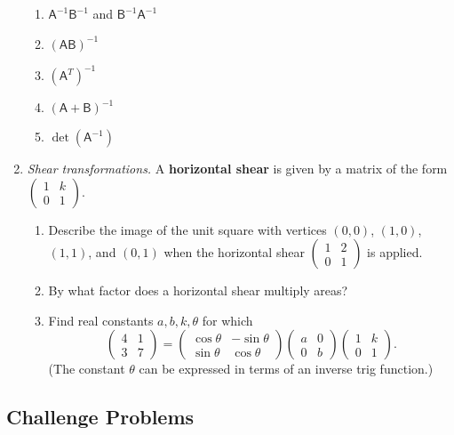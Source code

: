 \begin{enumerate}
\begin{enumerate}
\item $\mathsf{A}^{-1}\mathsf{B}^{-1}$ and $\mathsf{B}^{-1}\mathsf{A}^{-1}$
\item $(\mathsf{AB})^{-1}$
\item $(\mathsf{A}^T)^{-1}$
\item $(\mathsf{A} + \mathsf{B})^{-1}$
\item $\det(\mathsf{A}^{-1})$
\end{enumerate}
\item \emph{Shear transformations.} A \textbf{horizontal shear} is given by a matrix of the form $\begin{pmatrix} 1 & k \\ 0 & 1 \end{pmatrix}$.
\begin{enumerate}
\item Describe the image of the unit square with vertices $(0,0)$, $(1,0)$, $(1,1)$, and $(0,1)$ when the horizontal shear $\begin{pmatrix} 1 & 2 \\ 0 & 1 \end{pmatrix}$ is applied.
\item By what factor does a horizontal shear multiply areas?
\item Find real constants $a,b,k,\theta$ for which
\begin{equation*}
\begin{pmatrix} 4 & 1 \\ 3 & 7 \end{pmatrix} = \begin{pmatrix} \cos\theta & -\sin\theta \\ \sin\theta & \cos\theta \end{pmatrix}\begin{pmatrix} a & 0 \\ 0 & b \end{pmatrix}\begin{pmatrix} 1 & k \\ 0 & 1 \end{pmatrix}.
\end{equation*}
(The constant $\theta$ can be expressed in terms of an inverse trig function.)
\end{enumerate}
\end{enumerate}


\newpage
\subsection{Challenge Problems}

